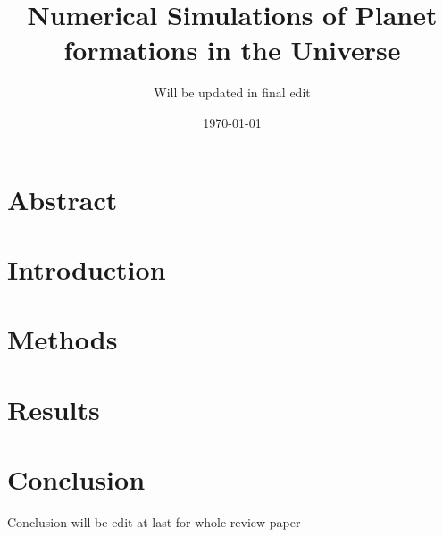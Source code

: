 \documentclass[12pt, a4paper]{article}
\title{Numerical Simulations of Planet formations in the Universe}
\author{Will be updated in final edit}
\date{\today}
\begin{document}
\maketitle

\section{Abstract}



\section{Introduction}



\section{Methods}


\section{Results}


\section{Conclusion}
Conclusion will be edit at last for whole review paper


\end{document}
